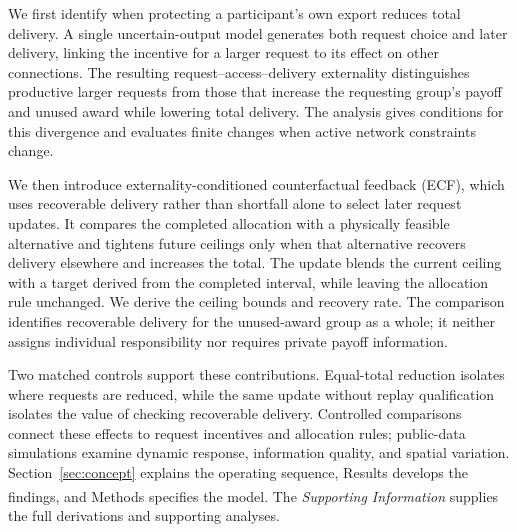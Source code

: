 \documentclass[twoside,twocolumn,9pt]{article}
\newcommand{\suppref}{\textit{Supporting Information}\textsuperscript{\dag}}
\begin{document}
We first identify when protecting a participant's own export reduces total
delivery. A single uncertain-output model generates both request choice and
later delivery, linking the incentive for a larger request to its effect on
other connections. The resulting request--access--delivery externality
distinguishes productive larger requests from those that increase the
requesting group's payoff and unused award while lowering total delivery.
The analysis gives conditions for this divergence and evaluates finite changes
when active network constraints change.

We then introduce externality-conditioned counterfactual feedback (ECF), which
uses recoverable delivery rather than shortfall alone to select later request
updates. It compares the completed allocation with a physically feasible
alternative and tightens future ceilings only when that alternative recovers
delivery elsewhere and increases the total. The update blends the current
ceiling with a target derived from the completed interval, while leaving the
allocation rule unchanged. We derive the ceiling bounds and recovery rate.
The comparison identifies recoverable delivery for the unused-award group as
a whole; it neither assigns individual responsibility nor requires private
payoff information.

Two matched controls support these contributions. Equal-total reduction
isolates where requests are reduced, while the same update without replay
qualification isolates the value of checking recoverable delivery. Controlled
comparisons connect these effects to request incentives and allocation rules;
public-data simulations examine dynamic response, information quality, and
spatial variation. Section~\ref{sec:concept} explains the operating sequence,
Results develops the findings, and Methods specifies the model. The
\suppref{} supplies the full derivations and supporting analyses.
\end{document}
